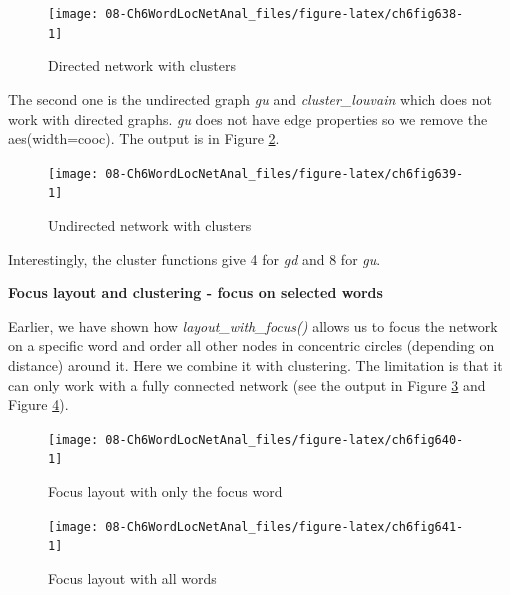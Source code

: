\documentclass[
]{article}
\begin{document}
\begin{figure}

{\centering \texttt{[image: 08-Ch6WordLocNetAnal\_files/figure-latex/ch6fig638-1]} 

}

\caption{Directed network with clusters}\label{fig:ch6fig638}
\end{figure}

The second one is the undirected graph \emph{gu} and \emph{cluster\_louvain} which does not work with directed graphs. \emph{gu} does not have edge properties so we remove the aes(width=cooc). The output is in Figure \ref{fig:ch6fig639}.

\begin{figure}

{\centering \texttt{[image: 08-Ch6WordLocNetAnal\_files/figure-latex/ch6fig639-1]} 

}

\caption{Undirected network with clusters}\label{fig:ch6fig639}
\end{figure}

Interestingly, the cluster functions give 4 for \emph{gd} and 8 for \emph{gu}.

\textbf{Focus layout and clustering - focus on selected words}

Earlier, we have shown how \emph{layout\_with\_focus()} allows us to focus the network on a specific word and order all other nodes in concentric circles (depending on distance) around it. Here we combine it with clustering. The limitation is that it can only work with a fully connected network (see the output in Figure \ref{fig:ch6fig640} and Figure \ref{fig:ch6fig641}).

\begin{figure}

{\centering \texttt{[image: 08-Ch6WordLocNetAnal\_files/figure-latex/ch6fig640-1]} 

}

\caption{Focus layout with only the focus word}\label{fig:ch6fig640}
\end{figure}

\begin{figure}

{\centering \texttt{[image: 08-Ch6WordLocNetAnal\_files/figure-latex/ch6fig641-1]} 

}

\caption{Focus layout with all words}\label{fig:ch6fig641}
\end{figure}
\end{document}
